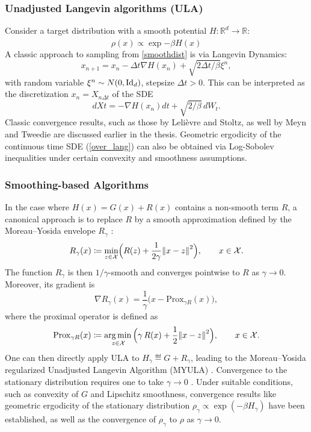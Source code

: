 \documentclass{article}
\begin{document}
\subsubsection{Unadjusted Langevin algorithms (ULA)}
Consider a target distribution with a smooth potential $H: \mathbb{R}^d \xrightarrow[]{} \mathbb{R}$:
\begin{equation} \label{smoothdist}
    \rho(x) \propto \exp{-\beta H(x)}
\end{equation}
A classic approach to sampling from \ref{smoothdist} is via Langevin Dynamics:
\begin{equation}
    x_{n+1} = x_n - \Delta t\nabla H(x_n) + \sqrt{2\Delta t/\beta} \xi^n,
\end{equation}
with random variable $\xi^n \sim N(0,\mathrm{Id}_d)$, stepsize $\Delta t >0$. This can be interpreted as the discretization $x_n = X_{n \Delta t}$ of the SDE
\begin{equation} \label{over_lang}
    dXt = -\nabla H(x_n) dt + \sqrt{2/\beta} \, dW_t.
\end{equation}
Classic convergence results, such as those by Leli{\`e}vre and Stoltz, as well by Meyn and Tweedie \cite{Meyn2012-oq} are discussed earlier in the thesis. Geometric ergodicity of the continuous time SDE (\ref{over_lang}) can also be obtained via Log-Sobolev inequalities under certain convexity and smoothness assumptions.

\subsubsection{Smoothing-based Algorithms}
In the case where $H(x) = G(x) + R(x)$ contains a non-smooth term $R$, a canonical approach is to replace $R$ by a smooth approximation defined by the Moreau--Yosida envelope $R_\gamma$ \cite{pereyra2016proximal}:
$$
R_\gamma(x)\eqdef \min_{z\in \mathcal X} \Bigl(R(z) + \frac{1}{2\gamma}\norm{x-z}^2\Bigr),\qquad x\in \mathcal X.
$$
The function $R_\gamma$ is then $1/\gamma$-smooth and converges pointwise to $R$ as $\gamma \to 0$. 
Moreover, its gradient is
$$
\nabla R_\gamma(x) = \frac{1}{\gamma}\bigl( x - \mathrm{Prox}_{\gamma R}(x)\bigr),
$$
where the proximal operator is defined as
\begin{align*}
    \mathrm{Prox}_{\gamma R}(x) \eqdef \argmin_{z\in \mathcal X} \Bigl(\gamma\, R(x) + \frac12 \norm{x-z}^2\Bigr),\qquad x\in \mathcal X.
\end{align*}
One can then directly apply ULA to $H_\gamma\eqdef G + R_\gamma$, leading to the Moreau--Yosida regularized Unadjusted Langevin Algorithm (MYULA) \cite{durmus2018efficient}. Convergence to the stationary distribution requires one to take $\gamma \to 0$ \cite{durmus2018efficient}. Under suitable conditions, such as convexity of $G$ and Lipschitz smoothness, convergence results like geometric ergodicity of the stationary distribution   $\rho_\gamma \propto \exp(-\beta H_\gamma)$ have been established, as well as the convergence of $\rho_\gamma$ to $\rho$ as $\gamma \to 0$.
\end{document}
